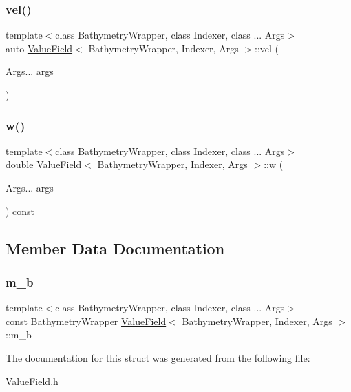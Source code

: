 \mbox{\label{structValueField_ab9bc5f617316a2aad361f53d9781e8fe}} 
\subsubsection{\texorpdfstring{vel()}{vel()}\hspace{0.1cm}{\footnotesize\ttfamily [2/2]}}
{\footnotesize\ttfamily template$<$class Bathymetry\+Wrapper, class Indexer, class ... Args$>$ \\
auto \hyperlink{structValueField}{Value\+Field}$<$ Bathymetry\+Wrapper, Indexer, Args $>$\+::vel (\begin{DoxyParamCaption}\item[{Args...}]{args }\end{DoxyParamCaption})\hspace{0.3cm}{\ttfamily [inline]}}

\mbox{\label{structValueField_a5ea42e809989b2b1a5a84683172ab659}} 
\subsubsection{\texorpdfstring{w()}{w()}}
{\footnotesize\ttfamily template$<$class Bathymetry\+Wrapper, class Indexer, class ... Args$>$ \\
double \hyperlink{structValueField}{Value\+Field}$<$ Bathymetry\+Wrapper, Indexer, Args $>$\+::w (\begin{DoxyParamCaption}\item[{Args...}]{args }\end{DoxyParamCaption}) const\hspace{0.3cm}{\ttfamily [inline]}}



\subsection{Member Data Documentation}
\mbox{\label{structValueField_a8d78592f8d0fc2926b52c7772c759831}} 
\subsubsection{\texorpdfstring{m\+\_\+b}{m\_b}}
{\footnotesize\ttfamily template$<$class Bathymetry\+Wrapper, class Indexer, class ... Args$>$ \\
const Bathymetry\+Wrapper \hyperlink{structValueField}{Value\+Field}$<$ Bathymetry\+Wrapper, Indexer, Args $>$\+::m\+\_\+b}



The documentation for this struct was generated from the following file\+:\begin{DoxyCompactItemize}
\item 
\hyperlink{ValueField_8h}{Value\+Field.\+h}\end{DoxyCompactItemize}
